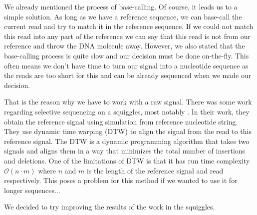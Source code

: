 
We already mentioned the process of base-calling. Of course, it leads us to a simple
solution. As long as we have a reference sequence, we can base-call the current read
and try to match it in the reference sequence. If we could not match this read
into any part of the reference we can say that this read is not from our reference
and throw the DNA molecule away. However, we also stated that the base-calling process
is quite slow and our decision must be done on-the-fly. This often means we don't
have time to turn our signal into a nucleotide sequence as the reads are too short for this
and can be already sequenced when we made our decision.

That is the reason why we have to work with a raw signal. There was some work
regarding selective sequencing on a squiggles, most notably \cite{loose2016real}. In their
work, they obtain the reference signal using simulation from reference nucleotide
string. They use dynamic time warping (DTW) to align the signal from the read to
this reference signal. The DTW is a dynamic programming algorithm that takes two signals and aligns them in a
way that minimizes the total number of insertions and deletions. One of the limitations
of DTW is that it has run time complexity $\mathcal{O}(n\cdot m)$ where $n$ and $m$
is the length of the reference signal and read respectively. This poses a problem
for this method if we wanted to use it for longer sequences...

We decided to try improving the results of the work in the squiggles.
